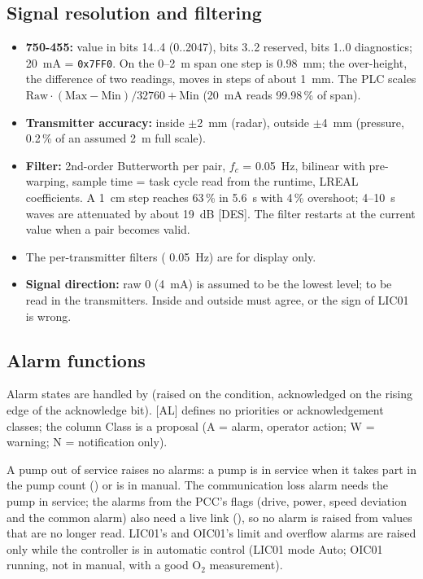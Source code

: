 \documentclass[11pt,a4paper]{article}
\begin{document}
\subsection{Signal resolution and filtering}
\begin{itemize}[nosep]
  \item \textbf{750-455:} value in bits 14..4 (0..2047), bits 3..2 reserved, bits 1..0 diagnostics;
        20~mA = \texttt{0x7FF0}. On the 0--2~m span one step is 0.98~mm; the over-height, the
        difference of two readings, moves in steps of about 1~mm. The PLC scales
        $\text{Raw}\cdot(\text{Max}-\text{Min})/32760 + \text{Min}$ (20~mA reads 99.98\,\% of span).
  \item \textbf{Transmitter accuracy:} inside $\pm$2~mm (radar), outside $\pm$4~mm (pressure, 0.2\,\%
        of an assumed 2~m full scale).
  \item \textbf{Filter:} 2nd-order Butterworth per pair, $f_c$ = 0.05~Hz, bilinear with pre-warping,
        sample time = task cycle read from the runtime, LREAL coefficients. A 1~cm step reaches 63\,\% in
        5.6~s with 4\,\% overshoot; 4--10~s waves are attenuated by about 19~dB [DES]. The filter
        restarts at the current value when a pair becomes valid.
  \item The per-transmitter filters ( 0.05~Hz) are for display only.
  \item \textbf{Signal direction:} raw 0 (4~mA) is assumed to be the lowest level; to be read in the
        transmitters. Inside and outside must agree, or the sign of LIC01 is wrong.
\end{itemize}

\subsection{Alarm functions}
Alarm states are handled by  (raised on the condition, acknowledged on the
rising edge of the acknowledge bit). [AL] defines no priorities or acknowledgement classes; the
column Class is a proposal (A = alarm, operator action; W = warning; N = notification only).

A pump out of service raises no alarms: a pump is in service when it takes part in the pump count
() or is in manual. The communication loss alarm needs the pump in
service; the alarms from the PCC's flags (drive, power, speed deviation and the common alarm) also need a
live link (), so no alarm is raised from values that are no longer
read. LIC01's and OIC01's limit and overflow alarms are raised only while the controller is in automatic
control (LIC01 mode Auto; OIC01 running, not in manual, with a good O$_2$ measurement).
\end{document}
